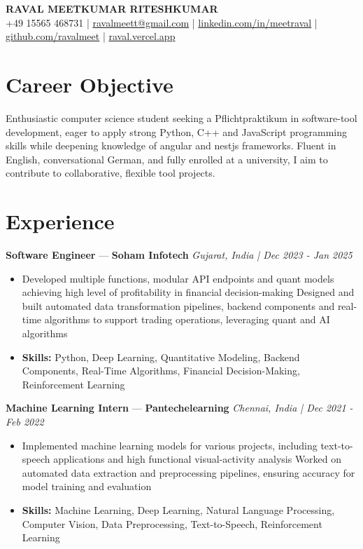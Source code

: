 \documentclass[a4paper,10pt]{article}
\begin{document}
\begin{center}
  {\Large\bfseries RAVAL MEETKUMAR RITESHKUMAR}\\[2pt]
  {\small +49 15565 468731 \;|\; \href{mailto:ravalmeett@gmail.com}{ravalmeett@gmail.com} \;|\; \href{https://www.linkedin.com/in/meetraval/}{linkedin.com/in/meetraval} \;|\; \href{https://github.com/ravalmeet}{github.com/ravalmeet} \;|\; \href{https://raval.vercel.app/}{raval.vercel.app}}
\end{center}
\vspace{-3pt}

\section*{Career Objective}
Enthusiastic computer science student seeking a Pflichtpraktikum in software-tool development, eager to apply strong Python, C++ and JavaScript programming skills while deepening knowledge of angular and nestjs frameworks. Fluent in English, conversational German, and fully enrolled at a university, I aim to contribute to collaborative, flexible tool projects.\par

\section*{Experience}
\textbf{Software Engineer} — \textbf{Soham Infotech} \hfill \textit{Gujarat, India \;|\; Dec 2023 - Jan 2025}\par
\vspace{1pt}
\begin{itemize}
  \item Developed multiple functions, modular API endpoints and quant models achieving high level of profitability in financial decision-making Designed and built automated data transformation pipelines, backend components and real-time algorithms to support trading operations, leveraging quant and AI algorithms
  \item \textbf{Skills:} Python, Deep Learning, Quantitative Modeling, Backend Components, Real-Time Algorithms, Financial Decision-Making, Reinforcement Learning
\end{itemize}
\vspace{3pt}
\textbf{Machine Learning Intern} — \textbf{Pantechelearning} \hfill \textit{Chennai, India \;|\; Dec 2021 - Feb 2022}\par
\vspace{1pt}
\begin{itemize}
  \item Implemented machine learning models for various projects, including text-to-speech applications and high functional visual-activity analysis Worked on automated data extraction and preprocessing pipelines, ensuring accuracy for model training and evaluation
  \item \textbf{Skills:} Machine Learning, Deep Learning, Natural Language Processing, Computer Vision, Data Preprocessing, Text-to-Speech, Reinforcement Learning
\end{itemize}
\end{document}
